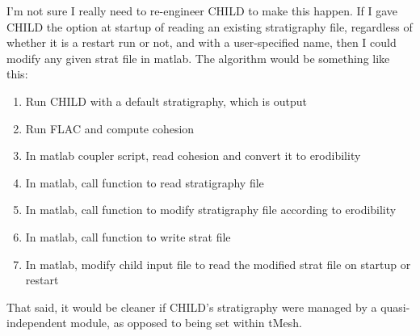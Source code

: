 \documentclass[12pt]{amsart}
\begin{document}
I'm not sure I really need to re-engineer CHILD to make this happen. If I gave CHILD the option at startup of reading an existing stratigraphy file, regardless of whether it is a restart run or not, and with a user-specified name, then I could modify any given strat file in matlab.
The algorithm would be something like this:
\begin{enumerate}
  \item Run CHILD with a default stratigraphy, which is output
  \item Run FLAC and compute cohesion
  \item In matlab coupler script, read cohesion and convert it to erodibility
  \item In matlab, call function to read stratigraphy file
  \item In matlab, call function to modify stratigraphy file according to erodibility
  \item In matlab, call function to write strat file
  \item In matlab, modify child input file to read the modified strat file on startup or restart
\end{enumerate}

That said, it would be cleaner if CHILD's stratigraphy were managed by a quasi-independent module, as opposed to being set within tMesh.
\end{document}
